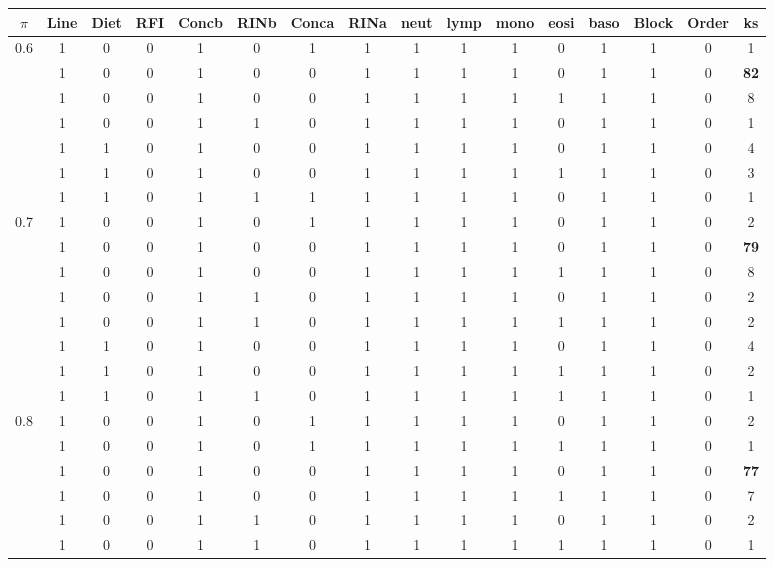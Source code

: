 \documentclass[12pt, letter]{article}\usepackage[]{graphicx}\usepackage[]{color}
\begin{document}
\begin{table}[ht]
\centering
{\scriptsize
\begin{tabular}{|c|c|c|c|c|c|c|c|c|c|c|c|c|c|c|c|}
  \hline
$\pi$ & Line & Diet & RFI & Concb & RINb & Conca & RINa & neut & lymp & mono & eosi & baso & Block & Order & ks \\ 
  \hline
0.6 & 1 & 0 & 0 & 1 & 0 & 1 & 1 & 1 & 1 & 1 & 0 & 1 & 1 & 0 & 1 \\ 
   & 1 & 0 & 0 & 1 & 0 & 0 & 1 & 1 & 1 & 1 & 0 & 1 & 1 & 0 & \textbf{82} \\ 
   & 1 & 0 & 0 & 1 & 0 & 0 & 1 & 1 & 1 & 1 & 1 & 1 & 1 & 0 & 8 \\ 
   & 1 & 0 & 0 & 1 & 1 & 0 & 1 & 1 & 1 & 1 & 0 & 1 & 1 & 0 & 1 \\ 
   & 1 & 1 & 0 & 1 & 0 & 0 & 1 & 1 & 1 & 1 & 0 & 1 & 1 & 0 & 4 \\ 
   & 1 & 1 & 0 & 1 & 0 & 0 & 1 & 1 & 1 & 1 & 1 & 1 & 1 & 0 & 3 \\ 
   & 1 & 1 & 0 & 1 & 1 & 1 & 1 & 1 & 1 & 1 & 0 & 1 & 1 & 0 & 1 \\ 
   \hline
0.7 & 1 & 0 & 0 & 1 & 0 & 1 & 1 & 1 & 1 & 1 & 0 & 1 & 1 & 0 & 2 \\ 
   & 1 & 0 & 0 & 1 & 0 & 0 & 1 & 1 & 1 & 1 & 0 & 1 & 1 & 0 & \textbf{79} \\ 
   & 1 & 0 & 0 & 1 & 0 & 0 & 1 & 1 & 1 & 1 & 1 & 1 & 1 & 0 & 8 \\ 
   & 1 & 0 & 0 & 1 & 1 & 0 & 1 & 1 & 1 & 1 & 0 & 1 & 1 & 0 & 2 \\ 
   & 1 & 0 & 0 & 1 & 1 & 0 & 1 & 1 & 1 & 1 & 1 & 1 & 1 & 0 & 2 \\ 
   & 1 & 1 & 0 & 1 & 0 & 0 & 1 & 1 & 1 & 1 & 0 & 1 & 1 & 0 & 4 \\ 
   & 1 & 1 & 0 & 1 & 0 & 0 & 1 & 1 & 1 & 1 & 1 & 1 & 1 & 0 & 2 \\ 
   & 1 & 1 & 0 & 1 & 1 & 0 & 1 & 1 & 1 & 1 & 1 & 1 & 1 & 0 & 1 \\ 
   \hline
0.8 & 1 & 0 & 0 & 1 & 0 & 1 & 1 & 1 & 1 & 1 & 0 & 1 & 1 & 0 & 2 \\ 
   & 1 & 0 & 0 & 1 & 0 & 1 & 1 & 1 & 1 & 1 & 1 & 1 & 1 & 0 & 1 \\ 
   & 1 & 0 & 0 & 1 & 0 & 0 & 1 & 1 & 1 & 1 & 0 & 1 & 1 & 0 & \textbf{77} \\ 
   & 1 & 0 & 0 & 1 & 0 & 0 & 1 & 1 & 1 & 1 & 1 & 1 & 1 & 0 & 7 \\ 
   & 1 & 0 & 0 & 1 & 1 & 0 & 1 & 1 & 1 & 1 & 0 & 1 & 1 & 0 & 2 \\ 
   & 1 & 0 & 0 & 1 & 1 & 0 & 1 & 1 & 1 & 1 & 1 & 1 & 1 & 0 & 1 \\ 

\end{tabular}}
\end{table}
\end{document}
